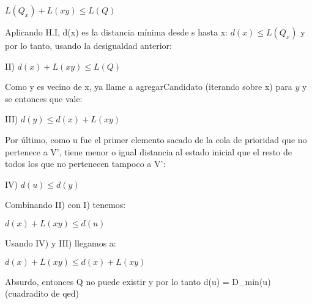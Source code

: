$L(Q_x)+L(xy) \leq L(Q)$

Aplicando H.I, d(x) es la distancia mínima desde s hasta x: $d(x) \leq L(Q_x)$ y por lo tanto, usando la desigualdad anterior:

II) $d(x)+L(xy) \leq L(Q) $

Como y es vecino de x, ya llame a agregarCandidato (iterando sobre x) para $y$ y se entonces que vale:

III) $d(y) \leq d(x) + L(xy)$

Por último, como u fue el primer elemento sacado de la cola de prioridad que no pertenece a V', tiene menor o igual distancia al estado inicial que el resto de todos los que no pertenecen tampoco a V':

IV) $d(u) \leq d(y) $

Combinando II) con I) tenemos:

$d(x)+L(xy) \leq d(u)$

Usando IV) y III) llegamos a:

$d(x)+L(xy) \leq d(x) + L(xy)$

Absurdo, entonces Q no puede existir y por lo tanto d(u) = D_min(u) (cuadradito de qed)
